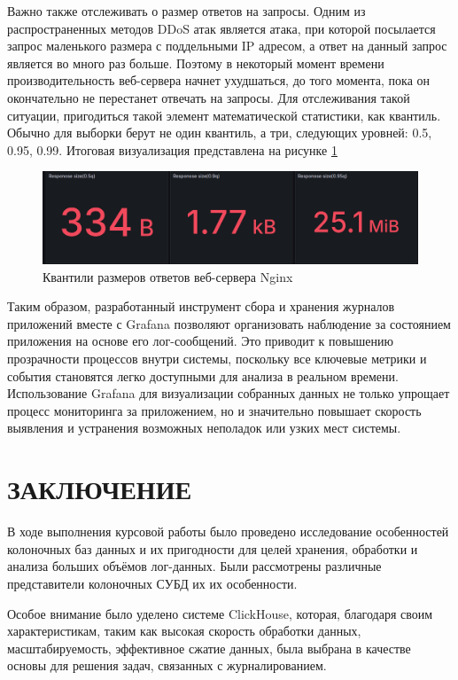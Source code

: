 \documentclass[14pt, russian]{scrartcl}
\newcommand{\anonsection}[1]{\cleardoublepage
\phantomsection
\addcontentsline{toc}{section}{\protect\numberline{}#1}
\section*{#1}\vspace*{2.5ex} %
}
\begin{document}
Важно также отслеживать о размер ответов на запросы. Одним из распространенных методов DDoS атак является атака, при которой посылается запрос маленького размера
с поддельными IP адресом, а ответ на данный запрос является во много раз больше. Поэтому в некоторый момент времени производительность 
веб-сервера начнет ухудшаться, до того момента, пока он окончательно не перестанет отвечать на запросы. Для отслеживания такой ситуации, пригодиться такой элемент математической статистики, как квантиль. Обычно для выборки берут не один квантиль, а три, следующих уровней: 0.5, 0.95, 0.99.
Итоговая визуализация представлена на рисунке \ref{fig:grafana_nginx_size_quantilies}

\begin{figure}[H]
	\centering
	\centering
	\includegraphics[width=.7\textwidth]{./imgs/nginx_grafana_size_quantilie.png}
	\caption{Квантили размеров ответов веб-сервера Nginx}
	\label{fig:grafana_nginx_size_quantilies}
\end{figure}

Таким образом, разработанный инструмент сбора и хранения журналов приложений вместе с Grafana позволяют организовать наблюдение за состоянием приложения на основе его лог-сообщений. Это приводит к повышению прозрачности процессов внутри системы, поскольку все ключевые метрики и события становятся легко доступными для анализа в реальном времени. Использование Grafana для визуализации собранных данных не только упрощает процесс мониторинга за приложением, но и значительно повышает скорость выявления и устранения возможных неполадок или узких мест системы.

\newpage

\anonsection{ЗАКЛЮЧЕНИЕ}

В ходе выполнения курсовой работы было проведено
исследование особенностей колоночных баз данных и их пригодности для целей хранения,
обработки и анализа больших объёмов лог-данных.
Были рассмотрены различные представители колоночных СУБД их их особенности.

Особое внимание было уделено системе ClickHouse,
которая, благодаря своим характеристикам,
таким как высокая скорость обработки данных, масштабируемость,
эффективное сжатие данных,
была выбрана в качестве основы для решения задач, связанных с журналированием.
\end{document}
